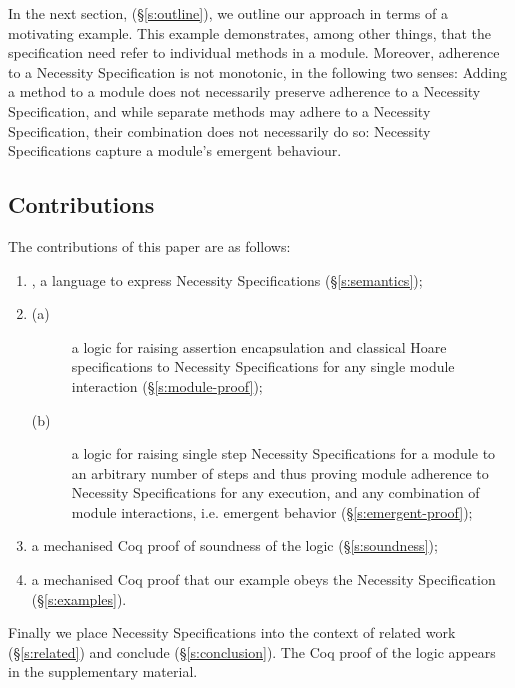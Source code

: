 In the next section, (\S\ref{s:outline}),  we outline our approach in terms of a motivating example.
This example demonstrates, among other things, that the specification need  refer  to  individual methods in a module.
Moreover, adherence to a Necessity Specification is not monotonic, in the following two senses:
Adding a method to a module does not necessarily preserve adherence to a Necessity Specification,
and while separate methods may adhere to a  Necessity Specification, their combination does
not necessarily do so: Necessity Specifications capture a module's emergent behaviour.


\subsection{Contributions}

The contributions of this paper are as follows:
 
 \begin{enumerate}
 \item
\Chainmail, a language to
express Necessity Specifications (\S\ref{s:semantics});
 \item
\begin{description}
\item [(a)]
{a logic for raising assertion encapsulation and classical Hoare specifications
to Necessity Specifications for any single module interaction (\S\ref{s:module-proof});}
\item [(b)]
 {a logic for raising single step Necessity Specifications for a module to an arbitrary number of steps
and thus proving module adherence to Necessity Specifications for any execution, and any combination of module interactions, i.e. emergent behavior (\S\ref{s:emergent-proof});}
\end{description}
\item
  a mechanised {Coq} proof of soundness of the logic (\S\ref{s:soundness});
\item
  a  {mechanised Coq} proof that %
  our example obeys the Necessity
  Specification (\S\ref{s:examples}).
\end{enumerate}


\noindent Finally we place Necessity Specifications into the context
of related work (\S\ref{s:related}) and conclude (\S\ref{s:conclusion}).
The Coq proof of the logic appears in the
supplementary material.









